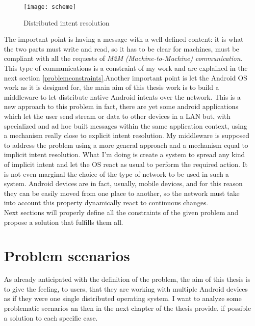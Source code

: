\begin{figure}[h]
	\centering
	\texttt{[image: scheme]}
	\caption{Distributed intent resolution}
	\label{fig:3.1}
\end{figure}
The important point is having a message with a well defined content: it is what the two parts must write and read, so it has to be clear for machines, must be compliant with all the requests of \textit{M2M (Machine-to-Machine) communication}. This type of communications is a constraint of my work and are explained in the next section \ref{problemconstraints}.Another important point is let the Android OS work as it is designed for, the main aim of this thesis work is to build a middleware to let distribute native Android intents over the network. This is a new approach to this problem in fact, there are yet some android applications which let the user send stream or data to other devices in a LAN but, with specialized and ad hoc built messages within the same application context, using a mechanism really close to explicit intent resolution. My middleware is supposed to address the problem using a more general approach and a mechanism equal to implicit intent resolution. What I'm doing is create a system to spread any kind of implicit intent and let the OS react as usual to perform the required action.
It is not even marginal the choice of the type of network to be used in such a system. Android devices are in fact, usually, mobile devices, and for this reason they can be easily moved from one place to another, so the network must take into account this property dynamically react to continuous changes.\\
Next sections will properly define all the constraints of the given problem and propose a solution that fulfills them all.
\section{Problem scenarios}
As already anticipated with the definition of the problem,  the aim of this thesis is to give the feeling, to users, that they are working with multiple Android devices as if they were one single distributed operating system. I want to analyze some problematic scenarios an then in the next chapter of the thesis provide, if possible a solution to each specific case.

